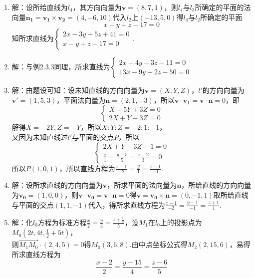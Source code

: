 \documentclass[UTF8]{ctexart}
\begin{document}
\begin{enumerate}
\item 解：设所给直线为$l_4$，其方向向量为$\mathbf{v}=\left(8,7,1\right)$，则$l_4$与$l_3$所确定的平面的法向量$\mathbf{n_1}=\mathbf{v_1}\times\mathbf{v_2}=\left(4,-6,10\right)$代入$l_2$上$\left(-13,5,0\right)$得$l_4$与$l_2$所确定的平面$$x-y+z-17=0$$知所求直线为$\left\{\begin{array}{l}2x-3y+5z+41=0\\x-y+z-17=0\end{array}\right.$.

\item 解：与例2.3.3同理，所求直线为$\left\{\begin{array}{l}2x+4y-3z-11=0\\13x-9y+2z-50=0\end{array}\right.$

\item 解：由题设可知：设未知直线的方向向量为$\mathbf{v}=\left(X,Y,Z\right)$，$l'$的方向向量为$\mathbf{v'}=\left(1,5,3\right)$，平面法向量为$\mathbf{n}=\left(2,1,-3\right)$，所以$\mathbf{v}\cdot\mathbf{v_1}=\mathbf{v}\cdot\mathbf{n}=0$，即$$\left\{\begin{array}{l}X+5Y+3Z=0\\2X+Y-3Z=0\end{array}\right.$$解得$X=-2Y,Z=-Y$，所以$X:Y:Z=-2:1:-1$，\\
又因为未知直线过$l'$与平面\uppercase\expandafter{}的交点$P$，所以$$\left\{\begin{array}{l}2X+Y-3Z+1=0\\\displaystyle\frac{x}{1}=\displaystyle\frac{y+5}{5}=\displaystyle\frac{z+2}{3}=0\end{array}\right.$$所以$P\left(1,0,1\right)$，所以直线方程为$\displaystyle\frac{x-1}{-2}=\displaystyle\frac{y}{1}=\displaystyle\frac{z-1}{-1}$.

\item 解：设所求直线的方向向量为$\mathbf{v}$，所求平面的法向量为$\mathbf{n}$，所给直线的方向向量为$\mathbf{v_0}=\left(1,0,0\right)$，则$\mathbf{v}\cdot\mathbf{v_0}=\mathbf{v}\cdot\mathbf{n}=0$得$\mathbf{v}=\mathbf{v_0}\times\mathbf{n}=\left(0,-1,1\right)$取所给直线与平面的交点$\left(1,1,-1\right)$代入，得所求直线方程为$\displaystyle\frac{x-1}{-2}=\displaystyle\frac{y-1}{-1}=\displaystyle\frac{z+1}{1}$.

\item 解：化$l_0$方程为标准方程$\displaystyle\frac{x}{2}=\displaystyle\frac{y}{4}=\displaystyle\frac{z+\frac{1}{2}}{5}$，设$M_1$在$l_0$上的投影点为$M_0\left(2t,4t,\displaystyle\frac{1}{2}+5t\right)$，\\
则$\overrightarrow{M_1M_0}\cdot\left(2,4,5\right)=0$得$M_0\left(3,6,8\right)$.由中点坐标公式得$M_2\left(2,15,6\right)$，易得所求直线方程为$$\displaystyle\frac{x-2}{2}=\displaystyle\frac{y-15}{4}=\displaystyle\frac{z-6}{5}$$


\end{enumerate}
\end{document}
